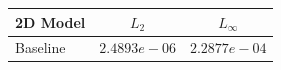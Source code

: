\begin{table}[ht]
\centering
\begin{tabular}{lcc}
\hline
2D Model & $L_2$ & $L_\infty$ \\
\hline
Baseline & $2.4893e-06$ & $2.2877e-04$ \\
\hline
\end{tabular}
\end{table}
